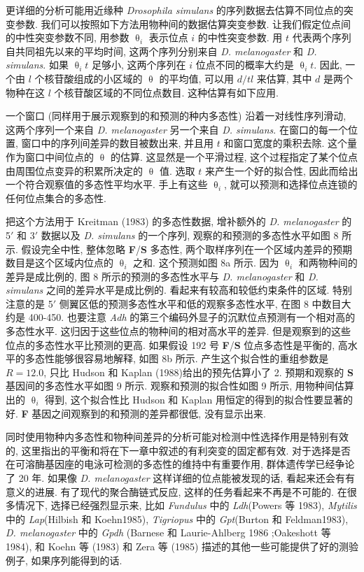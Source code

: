 \documentclass[
    12pt,%
    ]{article}
\begin{document}
更详细的分析可能用近缘种 \textit{Drosophila simulans} 的序列数据去估算不同位点的突变参数.
我们可以按照如下方法用物种间的数据估算突变参数. 让我们假定位点间的中性突变参数不同, 用参数 $\uptheta_{i}$ 表示位点 $i$
的中性突变参数. 用 $t$ 代表两个序列自共同祖先以来的平均时间, 这两个序列分别来自 \textit{D. melanogaster} 和
\textit{D. simulans}. 如果 $\uptheta_{i}t$ 足够小, 这两个序列在 $i$ 位点不同的概率大约是 $\uptheta_{i}t$. 因此,
一个由 $l$ 个核苷酸组成的小区域的 $\uptheta$ 的平均值, 可以用 $d/tl$ 来估算, 其中 $d$ 是两个物种在这 $l$
个核苷酸区域的不同位点数目. 这种估算有如下应用.

一个窗口 (同样用于展示观察到的和预测的种内多态性) 沿着一对线性序列滑动, 这两个序列一个来自 \textit{D.
melanogaster} 另一个来自 \textit{D. simulans}. 在窗口的每一个位置, 窗口中的序列间差异的数目被数出来, 并且用 $t$
和窗口宽度的乘积去除. 这个量作为窗口中间位点的 $\uptheta$ 的估算. 这显然是一个平滑过程,
这个过程指定了某个位点由周围位点变异的积累所决定的 $\uptheta$ 值. 选取 $t$ 来产生一个好的拟合性,
因此而给出一个符合观察值的多态性平均水平. 手上有这些 $\uptheta_{i}$, 就可以预测和选择位点连锁的任何位点集合的多态性.

把这个方法用于 Kreitman (1983) 的多态性数据, 增补额外的 \textit{D. melanogaster} 的 5${\prime}$ 和
3${\prime}$ 数据以及 \textit{D. simulans} 的一个序列, 观察的和预测的多态性水平如图 8 所示. 假设完全中性,
整体忽略 \textbf{F}/\textbf{S} 多态性, 两个取样序列在一个区域内差异的预期数目是这个区域内位点的 $\uptheta _{i}$ 之和.
这个预测如图 8a 所示. 因为 $\uptheta _{i}$ 和两物种间的差异是成比例的, 图 8 所示的预测的多态性水平与 \textit{D.
melanogaster} 和 \textit{D. simulans} 之间的差异水平是成比例的. 看起来有较高和较低约束条件的区域. 特别注意的是
5${\prime}$ 侧翼区低的预测多态性水平和低的观察多态性水平, 在图 8 中数目大约是 400-450.
也要注意 \textit{Adh} 的第三个编码外显子的沉默位点预测有一个相对高的多态性水平. 这归因于这些位点的物种间的相对高水平的差异.
但是观察到的这些位点的多态性水平比预测的更高. 如果假设 192 号 \textbf{F}/\textbf{S} 位点多态性是平衡的,
高水平的多态性能够很容易地解释, 如图 8b 所示. 产生这个拟合性的重组参数是 $R=12.0$, 只比 Hudson 和
Kaplan (1988)给出的预先估算小了 2. 预期和观察的 \textbf{S} 基因间的多态性水平如图 9 所示. 观察和预测的拟合性如图 9
所示, 用物种间估算出的 $\uptheta _{i}$ 得到, 这个拟合性比 Hudson 和 Kaplan 用恒定的得到的拟合性要显著的好.
\textbf{F} 基因之间观察到的和预测的差异都很低, 没有显示出来.

同时使用物种内多态性和物种间差异的分析可能对检测中性选择作用是特别有效的,
这里指出的平衡和将在下一章中叙述的有利突变的固定都有效. 对于选择是否在可溶酶基因座的电泳可检测的多态性的维持中有重要作用,
群体遗传学已经争论了 20 年. 如果像 \textit{D. melanogaster} 这样详细的位点能被发现的话, 看起来还会有有意义的进展.
有了现代的聚合酶链式反应, 这样的任务看起来不再是不可能的. 在很多情况下, 选择已经强烈显示来,
比如 \textit{Fundulus} 中的 \textit{Ldh}(Powers 等 1983), \textit{Mytilis} 中的 \textit{Lap}(Hilbish 和
Koehn1985), \textit{Tigriopus} 中的 \textit{Gpt}(Burton 和 Feldman1983), \textit{D.
melanogaster} 中的 \textit{Gpdh} (Barnese 和 Laurie-Ahlberg 1986 ;Oakeshott 等 1984), 和 Koehn 等 (1983)
和 Zera 等 (1985) 描述的其他一些可能提供了好的测验例子, 如果序列能得到的话.
\end{document}
